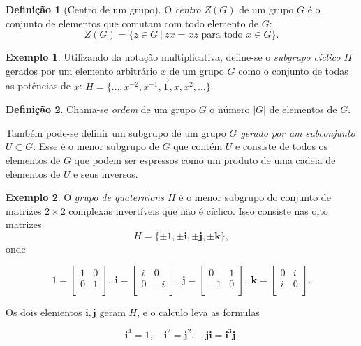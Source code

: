 \documentclass[a4paper,12pt]{report}
\theoremstyle{plain}
\theoremstyle{definition}
\newtheorem{definicao}{Definição}[section]
\newtheorem{exemplo}{Exemplo}[section]
\begin{document}
	\begin{definicao}[Centro de um grupo]
		O \emph{centro} \(Z(G)\) de um grupo \(G\) é o
		conjunto de elementos que comutam com todo elemento de \(G\):
		\[Z(G) = \{z \in G \ | \ zx = xz \text{ para todo } x \in G\}.\]
	\end{definicao}
	
	\begin{exemplo}
		Utilizando da notação multiplicativa, define-se o
		\emph{subgrupo cíclico \(H\)} gerados por um elemento arbitrário \(x\)
		de um grupo \(G\) como o conjunto de todas as potências de \(x\):
		\(H = \{\dots , x^{-2}, x^{-1},\vec{1},x,x^2,\dots\}\).
	\end{exemplo}
	
	\begin{definicao}
		Chama-se \emph{ordem} de um grupo \(G\) o número \(|G|\) de elementos de \(G\).
	\end{definicao}
	
	Também pode-se definir um subgrupo de um grupo \emph{\(G\) gerado por um
	subconjunto \(U \subset G\)}. Esse é o menor subgrupo de \(G\) que
	contém \(U\) e consiste de todos os elementos de \(G\) que podem ser
	espressos como um produto de uma cadeia de elementos de \(U\) e seus
	inversos.
	
	\begin{exemplo}
		O \emph{grupo de quaternions \(H\)} é o menor subgrupo
		do conjunto de matrizes \(2\times 2\) complexas invertíveis que não é
		cíclico. Isso consiste nas oito matrizes
		\[H = \{\pm 1, \pm \mathbf{i}, \pm \mathbf{j}, \pm \mathbf{k}\},\] onde
		
		\[
		1=
		\begin{bmatrix}
			1 & 0 \\
			0 & 1 \\
		\end{bmatrix},
		\ \mathbf{i}=
		\begin{bmatrix}
			i & 0 \\
			0 & -i \\
		\end{bmatrix},
		\ \mathbf{j}=
		\begin{bmatrix}
			0 & 1 \\
			-1 & 0 \\
		\end{bmatrix},
		\ \mathbf{k}=
		\begin{bmatrix}
			0 & i \\
			i & 0 \\
		\end{bmatrix}.
		\]
		
		Os dois elementos \(\mathbf{i}, \mathbf{j}\) geram \(H\), e o calculo
		leva as formulas
		
		\[\mathbf{i}^4 = 1, \quad \mathbf{i}^2 = \mathbf{j}^2, \quad \mathbf{j}\mathbf{i} = \mathbf{i}^3\mathbf{j}.\]
	\end{exemplo}
	
\end{document}
